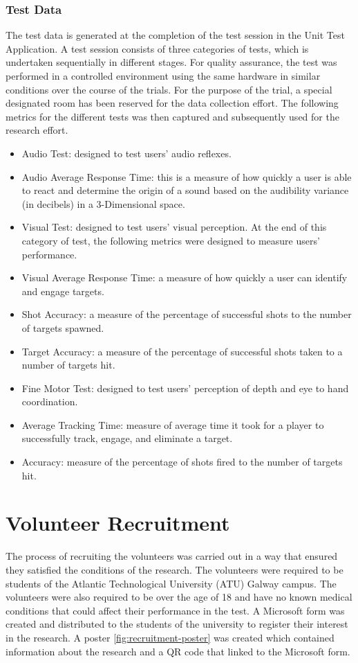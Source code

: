 \subsubsection*{Test Data}
The test data is generated at the completion of the test session in the Unit Test Application. A test session consists of three categories of tests, which is undertaken sequentially in different stages. 
For quality assurance, the test was performed in a controlled environment using the same hardware in similar conditions over the course of the trials. For the purpose of the trial, a special designated room
has been reserved for the data collection effort. The following metrics for the different tests was then captured and subsequently used for the research effort.

\begin{itemize}
    \item Audio Test: designed to test users’ audio reflexes. 
    \item Audio Average Response Time: this is a measure of how quickly a user is able to react and determine the origin of a sound based on the audibility variance (in decibels) in a 3-Dimensional space. 
    \item Visual Test: designed to test users’ visual perception. At the end of this category of test, the following metrics were designed to measure users’ performance. 
    \item Visual Average Response Time: a measure of how quickly a user can identify and engage targets. 
    \item Shot Accuracy: a measure of the percentage of successful shots to the number of targets spawned. 
    \item Target Accuracy: a measure of the percentage of successful shots taken to a number of targets hit. 
    \item Fine Motor Test: designed to test users’ perception of depth and eye to hand coordination. 
    \item Average Tracking Time: measure of average time it took for a player to successfully track, engage, and eliminate a target.
    \item Accuracy: measure of the percentage of shots fired to the number of targets hit. 
\end{itemize}






\section{Volunteer Recruitment}
The process of recruiting the volunteers was carried out in a way that ensured they satisfied the conditions of the research. The volunteers were required to be students of the Atlantic 
Technological University (ATU) Galway campus. The volunteers were also required to be over the age of 18 and have no known medical conditions that could affect their performance in the
test. A Microsoft form was created and distributed to the students of the university to register their interest in the research. A poster \ref{fig:recruitment-poster} was created
which contained information about the research and a QR code that linked to the Microsoft form.


